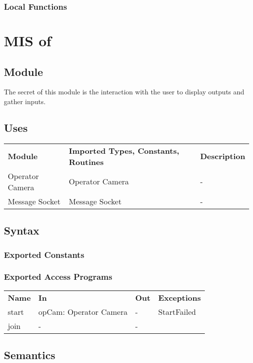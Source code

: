 \documentclass[12pt, titlepage]{article}
\begin{document}
\subsubsection{Local Functions}
\newpage

\section{MIS of } \label{MIS_USER_INTERFACE} 
\subsection{Module}
The secret of this module is the interaction with the user to display outputs and gather inputs.
\subsection{Uses}
\begin{center}
\begin{tabular}{p{2 cm} p{5cm} p{6.5cm} } 
\hline
\textbf{Module} & \textbf{Imported Types, Constants, Routines} & \textbf{Description} \\
Operator Camera & Operator Camera & - \\
Message Socket & Message Socket & - \\
\hline
\hline
\end{tabular}
\end{center}
\subsection{Syntax}
\subsubsection{Exported Constants}
\subsubsection{Exported Access Programs}
\begin{center}
\begin{tabular}{p{2.5cm} p{3.5cm} p{2.5cm} p{5cm}}
\hline
\textbf{Name} & \textbf{In} & \textbf{Out} & \textbf{Exceptions} \\
start & opCam: Operator Camera & - & StartFailed \\
join & - & - \\
\hline
\hline
\end{tabular}
\end{center}
\subsection{Semantics}
\end{document}
